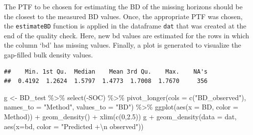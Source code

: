 \documentclass[
  10pt,
  b5paper,
  oneside]{book}
\newenvironment{Shaded}{\begin{snugshade}}{\end{snugshade}}
\newcommand{\AttributeTok}[1]{\textcolor[rgb]{0.77,0.63,0.00}{#1}}
\newcommand{\CommentTok}[1]{\textcolor[rgb]{0.56,0.35,0.01}{\textit{#1}}}
\newcommand{\DecValTok}[1]{\textcolor[rgb]{0.00,0.00,0.81}{#1}}
\newcommand{\DocumentationTok}[1]{\textcolor[rgb]{0.56,0.35,0.01}{\textbf{\textit{#1}}}}
\newcommand{\FloatTok}[1]{\textcolor[rgb]{0.00,0.00,0.81}{#1}}
\newcommand{\FunctionTok}[1]{\textcolor[rgb]{0.00,0.00,0.00}{#1}}
\newcommand{\NormalTok}[1]{#1}
\newcommand{\OtherTok}[1]{\textcolor[rgb]{0.56,0.35,0.01}{#1}}
\newcommand{\SpecialCharTok}[1]{\textcolor[rgb]{0.00,0.00,0.00}{#1}}
\newcommand{\StringTok}[1]{\textcolor[rgb]{0.31,0.60,0.02}{#1}}
\begin{document}
The PTF to be chosen for estimating the BD of the missing horizons should be the closest to the measured BD values. Once, the appropriate PTF was chosen, the \texttt{estimateBD} function is applied in the dataframe \texttt{dat} that was created at the end of the quality check. Here, new bd values are estimated for the rows in which the column `bd' has missing values. Finally, a plot is generated to visualize the gap-filled bulk density values.

\begin{Shaded}
\end{Shaded}

\begin{verbatim}
##    Min. 1st Qu.  Median    Mean 3rd Qu.    Max.    NA's 
##  0.4192  1.2624  1.5797  1.4773  1.7008  1.7670     356
\end{verbatim}

\begin{Shaded}
\begin{Highlighting}[]
\NormalTok{g }\OtherTok{\textless{}{-}}\NormalTok{ BD\_test }\SpecialCharTok{\%\textgreater{}\%} 
  \FunctionTok{select}\NormalTok{(}\SpecialCharTok{{-}}\NormalTok{SOC) }\SpecialCharTok{\%\textgreater{}\%} 
  \FunctionTok{pivot\_longer}\NormalTok{(}\AttributeTok{cols =} \FunctionTok{c}\NormalTok{(}\StringTok{"BD\_observed"}\NormalTok{), }
               \AttributeTok{names\_to =} \StringTok{"Method"}\NormalTok{, }\AttributeTok{values\_to =} \StringTok{"BD"}\NormalTok{) }\SpecialCharTok{\%\textgreater{}\%} 
  \FunctionTok{ggplot}\NormalTok{(}\FunctionTok{aes}\NormalTok{(}\AttributeTok{x =}\NormalTok{ BD, }\AttributeTok{color =}\NormalTok{ Method)) }\SpecialCharTok{+} 
  \FunctionTok{geom\_density}\NormalTok{() }\SpecialCharTok{+}
  \FunctionTok{xlim}\NormalTok{(}\FunctionTok{c}\NormalTok{(}\DecValTok{0}\NormalTok{,}\FloatTok{2.5}\NormalTok{))}
\NormalTok{g }\SpecialCharTok{+} \FunctionTok{geom\_density}\NormalTok{(}\AttributeTok{data =}\NormalTok{ dat, }\FunctionTok{aes}\NormalTok{(}\AttributeTok{x=}\NormalTok{bd, }
                              \AttributeTok{color =} \StringTok{"Predicted +}\SpecialCharTok{\textbackslash{}n}\StringTok{ observed"}\NormalTok{))}
\end{Highlighting}
\end{Shaded}
\end{document}
